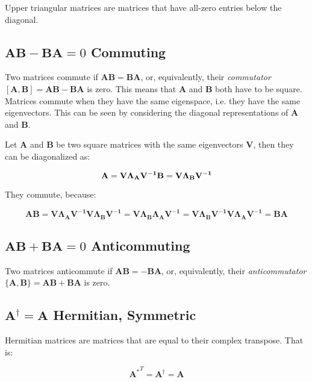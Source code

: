 Upper triangular matrices are matrices that have all-zero entries below the diagonal.



\subsection{$\mathbf{AB}-\mathbf{BA}=0$ Commuting}
Two matrices commute if $\mathbf{AB}=\mathbf{BA}$, or, equivalently, their \textit{commutator} $[\mathbf{A,B}] = \mathbf{AB}-\mathbf{BA}$ is zero. This means that $\mathbf{A}$ and $\mathbf{B}$ both have to be square. Matrices commute when they have the same eigenspace, i.e. they have the same eigenvectors. This can be seen by considering the diagonal representations of $\mathbf{A}$ and $\mathbf{B}$.

Let $\mathbf{A}$ and $\mathbf{B}$ be two square matrices with the same eigenvectors $\mathbf{V}$, then they can be diagonalized as:

\begin{equation}
\mathbf{A} = \mathbf{V\Lambda_A V^{-1}}\\
\mathbf{B} = \mathbf{V\Lambda_B V^{-1}}
\end{equation}

They commute, because:

\begin{equation}
\mathbf{AB} = \mathbf{V\Lambda_A V^{-1}V\Lambda_B V^{-1}} = \mathbf{V\Lambda_B \Lambda_A V^{-1}} = \mathbf{V\Lambda_B V^{-1}V\Lambda_A V^{-1}} = \mathbf{BA} 
\end{equation}



\subsection{$\mathbf{AB}+\mathbf{BA}=0$ Anticommuting}
Two matrices anticommute if $\mathbf{AB}=-\mathbf{BA}$, or, equivalently, their \textit{anticommutator} $\{\mathbf{A,B}\} = \mathbf{AB}+\mathbf{BA}$ is zero.


\subsection{$\mathbf{A}^{\dagger} = \mathbf{A}$ Hermitian, Symmetric}
\label{sec:hermitian}
Hermitian matrices are matrices that are equal to their complex transpose. That is:

\begin{equation}
{\mathbf{A}^{*}}^T = \mathbf{A}^\dagger = \mathbf{A} 
\end{equation}

